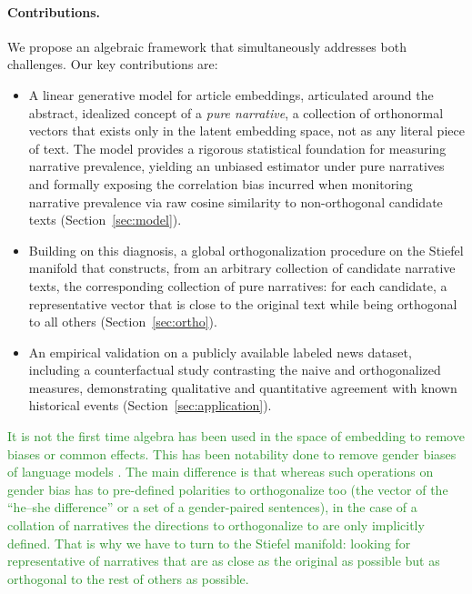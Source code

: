 \documentclass[
  journal=medium,
  manuscript=article-type,
  year=2025,
  volume=1,
]{cup-journal}
\begin{document}
\paragraph{Contributions.}
We propose an algebraic framework that simultaneously addresses both challenges.
Our key contributions are:
\begin{itemize}
    \item A linear generative model for article embeddings, articulated around the
          abstract, idealized concept of a \emph{pure narrative}, a collection of
          orthonormal vectors that exists only in the latent embedding space, not
          as any literal piece of text. The model provides a rigorous statistical
          foundation for measuring narrative prevalence, yielding an unbiased
          estimator under pure narratives and formally exposing the correlation
          bias incurred when monitoring narrative prevalence via raw cosine
          similarity to non-orthogonal candidate texts (Section~\ref{sec:model}).
    \item Building on this diagnosis, a global orthogonalization procedure on the
          Stiefel manifold that constructs, from an arbitrary collection of
          candidate narrative texts, the corresponding collection of pure
          narratives: for each candidate, a representative vector that is close
          to the original text while being orthogonal to all others
          (Section~\ref{sec:ortho}).
    \item An empirical validation on a publicly available labeled news dataset,
          including a counterfactual study contrasting the naive and
          orthogonalized measures, demonstrating qualitative and quantitative
          agreement with known historical events (Section~\ref{sec:application}).
\end{itemize}

\textcolor{ForestGreen}{
It is not the first time algebra has been used in the space of embedding to remove biases or common effects. This has been notability done to remove gender biases of language models \autocite{dev2019attenuating,dawkins2024projective}. The main difference is that whereas such operations on gender bias has to pre-defined polarities to orthogonalize too (the vector of the ``he–she difference'' or a set of a gender-paired sentences), in the case of a collation of narratives the directions to orthogonalize to are only implicitly defined. 
That is why we have to turn to the Stiefel manifold: looking for representative of narratives that are as close as the original as possible but as orthogonal to the rest of others as possible.
}
   
\end{document}
